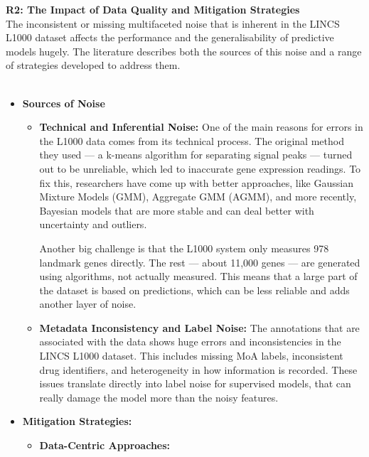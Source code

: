 \documentclass[twocolumn,12pt,a4paper]{article}
\begin{document}
\textbf{R2: The Impact of Data Quality and Mitigation Strategies}
\\
The inconsistent or missing multifaceted noise that is inherent in the LINCS L1000 dataset affects the performance and the generalisability of predictive models hugely\cite{szalai2019signatures}. The literature describes both the sources of this noise and a range of strategies developed to address them.
\\
\\
\begin{itemize}
  \item \textbf{Sources of Noise}
    \begin{itemize}
            \item \textbf{Technical and Inferential Noise:}
            One of the main reasons for errors in the L1000 data comes from its technical process. The original method they used — a k-means algorithm for separating signal peaks — turned out to be unreliable, which led to inaccurate gene expression readings. To fix this, researchers have come up with better approaches, like Gaussian Mixture Models (GMM), Aggregate GMM (AGMM), and more recently, Bayesian models that are more stable and can deal better with uncertainty and outliers\cite{qiu2020bayesian}.
        
            Another big challenge is that the L1000 system only measures 978 landmark genes directly. The rest — about 11,000 genes — are generated using algorithms, not actually measured. This means that a large part of the dataset is based on predictions, which can be less reliable and adds another layer of noise\cite{subramanian2017next,mcdermott2019deep}.
            \item \textbf{Metadata Inconsistency and Label Noise: }
            The annotations that are associated with the data shows huge errors and inconsistencies in the LINCS L1000 dataset. This includes missing MoA labels, inconsistent drug identifiers, and heterogeneity in how information is recorded. These issues translate directly into label noise for supervised models, that can really damage the model more than the noisy features\cite{szalai2019signatures}. 
            \end{itemize}
        \item \textbf{Mitigation Strategies:}
    
            \begin{itemize}
            \item \textbf{Data-Centric Approaches:}
            

\end{itemize}
\end{itemize}
\end{document}
